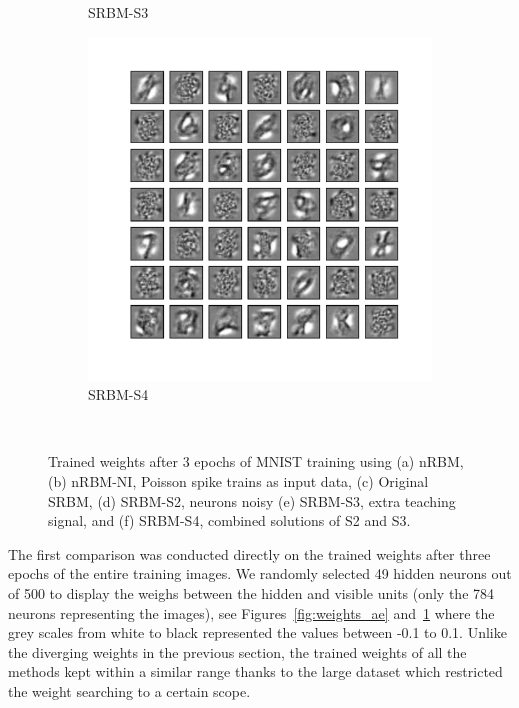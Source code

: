 \begin{figure}
\begin{subfigure}[t]{0.4\textwidth}
		\caption{SRBM-S3}
	\end{subfigure}
	\begin{subfigure}[t]{0.4\textwidth}
		\includegraphics[width=\textwidth]{pics_sdlm/53_MNIST_SRBM_all/2_60000_0.pdf}
		\caption{SRBM-S4}
	\end{subfigure}\\
	\caption{Trained weights after 3 epochs of MNIST training using (a) nRBM, (b) nRBM-NI, Poisson spike trains as input data, (c) Original SRBM, (d) SRBM-S2, neurons \protect{} \protect{} noisy \protect{} \protect{} (e) SRBM-S3, extra teaching signal, and (f) SRBM-S4, combined solutions of S2 and S3.}
	\label{fig:weights_rbm}
\end{figure}

The first comparison was conducted directly on the trained weights after three epochs of the entire training images.
We randomly selected 49 hidden neurons out of 500 to display the weighs between the hidden and visible units (only the 784 neurons representing the images), see Figures~\ref{fig:weights_ae} and~\ref{fig:weights_rbm} where the grey scales from white to black represented the values between -0.1 to 0.1.
Unlike the diverging weights in the previous section, the trained weights of all the methods kept within a similar range thanks to the large dataset which restricted the weight searching to a certain scope.  



